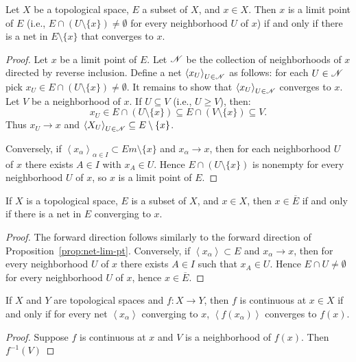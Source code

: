 \begin{proposition}\label{prop:net-lim-pt}
	Let $X$ be a topological space, $E$ a subset of $X$, and $x \in X$. Then $x$ is a limit point of $E$ (i.e., $E \cap (U \setminus \{x\}) \neq \emptyset$ for every neighborhood $U$ of $x$) if and only if there is a net in $E \setminus \{x\}$ that converges to $x$.
\end{proposition}
	\begin{proof}
		Let $x$ be a limit point of $E$. Let $\mathscr{N}$ be the collection of neighborhoods of $x$ directed by reverse inclusion. Define a net $\left<x_U \right>_{U \in \mathscr{N}}$ as follows: for each $U \in \mathscr{N}$ pick $x_U \in E \cap (U \setminus \{x\}) \neq \emptyset$. It remains to show that $\left<x_U \right>_{U \in \mathscr{N}}$ converges to $x$. Let $V$ be a neighborhood of $x$. If $U \subseteq V$ (i.e., $U \geq V$), then:
		\[
			x_U \in E \cap (U \setminus \{x\}) \subseteq E \cap (V \setminus \{x\}) \subseteq V.
		\]
		Thus $x_U \rightarrow x$ and $\left<X_U \right>_{U \in \mathscr{N}} \subseteq E \setminus \{ x\}$.

		Conversely, if $\left<x_\alpha \right>_{\alpha \in I} \subset E m\setminus \{x\}$ and $x_\alpha \rightarrow x$, then for each neighborhood $U$ of $x$ there exists $A \in I$ with $x_A \in U$. Hence $E \cap (U \setminus \{x\})$ is nonempty for every neighborhood $U$ of $x$, so $x$ is a limit point of $E$.
	\end{proof}

\begin{proposition}
	If $X$ is a topological space, $E$ is a subset of $X$, and $x \in X$, then $x \in \overline{E}$ if and only if there is a net in $E$ converging to $x$.
\end{proposition}
	\begin{proof}
		The forward direction follows similarly to the forward direction of Proposition~\ref{prop:net-lim-pt}. Conversely, if $\left<x_\alpha \right> \subset E$ and $x_\alpha \rightarrow x$, then for every neighborhood $U$ of $x$ there exists $A \in I$ such that $x_A \in U$. Hence $E \cap U \neq \emptyset$ for every neighborhood $U$ of $x$, hence $x \in \overline{E}$.
	\end{proof}

\begin{proposition}
	If $X$ and $Y$ are topological spaces and $f:X \rightarrow Y$, then $f$ is continuous at $x \in X$ if and only if for every net $\left<x_\alpha \right>$ converging to $x$, $\left<f(x_\alpha) \right>$ converges to $f(x)$. 
\end{proposition}
	\begin{proof}
		Suppose $f$ is continuous at $x$ and $V$ is a neighborhood of $f(x)$. Then $f^{-1}(V)$
	\end{proof}






